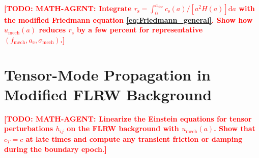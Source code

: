 \documentclass[11pt,a4paper]{article}
\newcommand{\dx}{\mathrm{d}}
\newcommand{\ac}{a_{\mathrm{c}}}
\newcommand{\rs}{r_{\mathrm{s}}}
\newcommand{\cs}{c_{\mathrm{s}}}
\newcommand{\sigmamech}{\sigma_{\mathrm{mech}}}
\newcommand{\fmech}{f_{\mathrm{mech}}}
\newcommand{\umech}{u_{\mathrm{mech}}}
\theoremstyle{definition}
\newcommand{\TODO}[1]{\textcolor{red}{\textbf{[TODO: #1]}}}
\begin{document}
\TODO{MATH-AGENT: Integrate $\rs = \int_0^{a_{\mathrm{dec}}} \cs(a)/[a^2 H(a)] \dx a$ with the modified Friedmann equation \eqref{eq:Friedmann_general}. Show how $\umech(a)$ reduces $\rs$ by a few percent for representative $(\fmech, \ac, \sigmamech)$.}


\section{Tensor-Mode Propagation in Modified FLRW Background}
\label{app:tensor_modes}

\TODO{MATH-AGENT: Linearize the Einstein equations for tensor perturbations $h_{ij}$ on the FLRW background with $\umech(a)$. Show that $c_T = c$ at late times and compute any transient friction or damping during the boundary epoch.}
\end{document}
